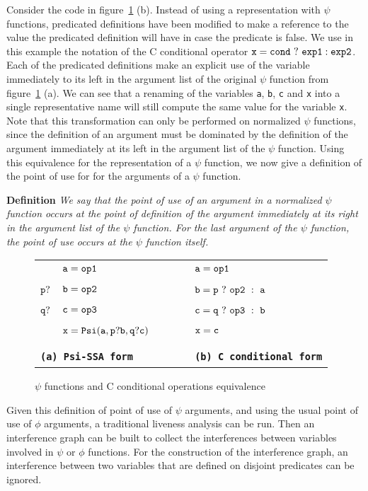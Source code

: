 Consider the code in figure~\ref{fig:psi_ccond} (b). Instead of using
a representation with $\psi$ functions, predicated definitions have
been modified to make a reference to the value the predicated
definition will have in case the predicate is false. We use in this
example the notation of the C conditional operator ${\tt x =
  cond\ ?\ exp1 : exp2}$. Each of the predicated definitions make an
explicit use of the variable immediately to its left in the argument
list of the original $\psi$ function from figure~\ref{fig:psi_ccond}
(a). We can see that a renaming of the variables {\tt a}, {\tt b},
{\tt c} and {\tt x} into a single representative name will still
compute the same value for the variable {\tt x}. Note that this
transformation can only be performed on normalized $\psi$ functions,
since the definition of an argument must be dominated by the
definition of the argument immediately at its left in the argument
list of the $\psi$ function. Using this equivalence for the
representation of a $\psi$ function, we now give a definition of the
point of use for for the arguments of a $\psi$ function.

{\bf Definition} {\em We say that the point of use of an argument in a
  normalized $\psi$ function occurs at the point of definition of the
  argument immediately at its right in the argument list of the $\psi$
  function. For the last argument of the $\psi$ function, the point of
  use occurs at the $\psi$ function itself. }

\begin{figure}
\begin{center}
\footnotesize
\begin{tabular}{llll}
           & ${\tt a = op1}$ & \ \ \ \ & ${\tt a = op1}$ \\
${\tt p?}$ & ${\tt b = op2}$ & \ \ \ \ & ${\tt b = p\ ?\ op2\ :\ a}$ \\
${\tt q?}$ & ${\tt c = op3}$ & \ \ \ \ & ${\tt c = q\ ?\ op3\ :\ b}$ \\
           & ${\tt x = Psi(a,p?b,q?c)}$ & \ \ \ \ & ${\tt x = c}$ \\
\\
\multicolumn{2}{l}{\tt {\bf (a)\ Psi-SSA form}} & \ \ \ \ & {\tt {\bf (b)\ C conditional form}}
\end{tabular}
\caption{$\psi$ functions and C conditional operations equivalence}
\label{fig:psi_ccond}
\end{center}
\end{figure}

Given this definition of point of use of $\psi$ arguments, and using
the usual point of use of $\phi$ arguments, a traditional liveness
analysis can be run. Then an interference graph can be built to
collect the interferences between variables involved in $\psi$ or
$\phi$ functions. For the construction of the interference graph, an
interference between two variables that are defined on disjoint
predicates can be ignored.

